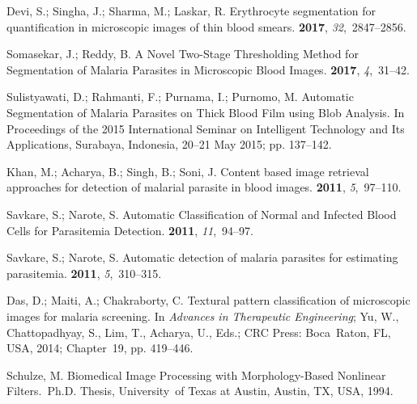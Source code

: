 \documentclass[sensors,review,accept,moreauthors,pdftex,10pt,a4paper]{mdpi}
\begin{document}
\begin{thebibliography}{999}
Devi, S.; Singha, J.; Sharma, M.; Laskar, R.
\newblock Erythrocyte segmentation for quantification in microscopic images of
  thin blood smears.
 {\bf 2017}, {\em
  32},~2847--2856.

Somasekar, J.; Reddy, B.
\newblock A Novel Two-Stage Thresholding Method for Segmentation of Malaria
  Parasites in Microscopic Blood Images.
 {\bf
  2017}, {\em 4},~31--42.

Sulistyawati, D.; Rahmanti, F.; Purnama, I.; Purnomo, M.
\newblock Automatic Segmentation of Malaria Parasites on Thick Blood Film using
  Blob Analysis.
\newblock  In Proceedings of the 2015 International Seminar on Intelligent
  Technology and Its Applications, Surabaya, Indonesia,  20--21 May 2015; pp. 137--142.

Khan, M.; Acharya, B.; Singh, B.; Soni, J.
\newblock Content based image retrieval approaches for detection of malarial
  parasite in blood images.
  {\bf 2011}, {\em 5},~97--110.

Savkare, S.; Narote, S.
\newblock Automatic Classification of Normal and Infected Blood Cells for
  Parasitemia Detection.
 {\bf 2011}, {\em 11},~94--97.

Savkare, S.; Narote, S.
\newblock Automatic detection of malaria parasites for estimating parasitemia.
  {\bf 2011}, {\em 5},~310--315.

Das, D.; Maiti, A.; Chakraborty, C. Textural pattern classification of
  microscopic images for malaria screening.
\newblock In {\em Advances in Therapeutic Engineering}; Yu, W., Chattopadhyay,
  S., Lim, T., Acharya, U., Eds.; CRC Press: Boca~Raton, FL, USA, 2014; Chapter~19, pp. 419--446.

Schulze, M.
\newblock Biomedical Image Processing with Morphology-Based Nonlinear Filters.~Ph.D. Thesis, University~of Texas at Austin, Austin, TX, USA, 1994.


\end{thebibliography}
\end{document}
